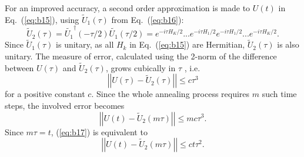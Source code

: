 \documentclass[../main.tex]{subfiles}
\begin{document}
For an improved accuracy, a second order approximation is made to $U(t)$ in Eq.~(\ref{eq:b15}), using $\tilde{U}_1(\tau)$ from Eq.~(\ref{eq:b16}):
\begin{equation}
\tilde{U}_2(\tau)=\tilde{U_1}^{\dagger}(-\tau/2)\tilde{U_1}(\tau /2)=e^{-i\tau H_K/2}...e^{-i\tau H_1/2}e^{-i\tau H_1/2}...e^{-i\tau H_K/2}.
\end{equation}
Since $\tilde{U}_1(\tau)$ is unitary, as all $H_k$ in Eq.~(\ref{eq:b15}) are Hermitian, $\tilde{U}_2(\tau)$ is also unitary. The measure of error, calculated using the 2-norm of the difference between $U(\tau)$ and  $\tilde{U}_2(\tau)$, grows cubically in $\tau$ \cite{de2004computational,de1989simulation,de1987product}, i.e.
\begin{equation}
\left| \left| U(\tau)-\tilde{U}_2(\tau) \right| \right| \leq c\tau ^3    
\end{equation} 
for a positive constant $c$. Since the whole annealing process requires $m$ such time steps, the involved error becomes
\begin{equation}
\left| \left| U(t)-\tilde{U}_2(m \tau) \right| \right| \leq m c \tau^3.  \label{eq:b17}
\end{equation}
Since $m \tau=t$, (\ref{eq:b17}) is equivalent to
\begin{equation}
\left| \left| U(t)-\tilde{U}_2(m \tau) \right| \right| \leq ct\tau^2. \label{eq:b18}
\end{equation}

\end{document}
